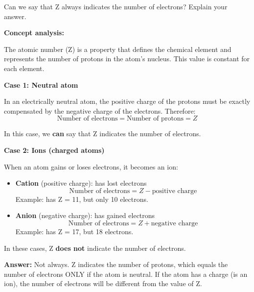 \begin{exercise}
    Can we say that Z always indicates the number of electrons? Explain your answer.
    \begin{solu}
        \textbf{Concept analysis:}

        The atomic number (Z) is a property that defines the chemical element and represents the number of protons in the atom's nucleus. This value is constant for each element.

        \textbf{Case 1: Neutral atom}

        In an electrically neutral atom, the positive charge of the protons must be exactly compensated by the negative charge of the electrons. Therefore:
        \[
            \text{Number of electrons} = \text{Number of protons} = Z
        \]

        In this case, we \textbf{can} say that Z indicates the number of electrons.

        \textbf{Case 2: Ions (charged atoms)}

        When an atom gains or loses electrons, it becomes an ion:
        \begin{itemize}
            \item \textbf{Cation} (positive charge): has lost electrons
            \[
                \text{Number of electrons} = Z - \text{positive charge}
            \]
            Example:  has Z = 11, but only 10 electrons.

            \item \textbf{Anion} (negative charge): has gained electrons
            \[
                \text{Number of electrons} = Z + \text{negative charge}
            \]
            Example:  has Z = 17, but 18 electrons.
        \end{itemize}

        In these cases, Z \textbf{does not} indicate the number of electrons.

        \textbf{Answer:} Not always. Z indicates the number of protons, which equals the number of electrons ONLY if the atom is neutral. If the atom has a charge (is an ion), the number of electrons will be different from the value of Z.
    \end{solu}
\end{exercise}
